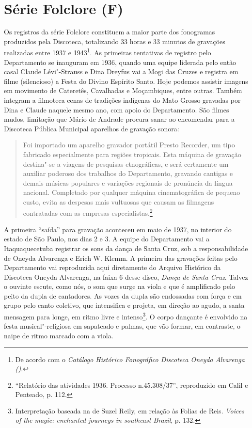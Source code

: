 \section{Série Folclore (F)}

Os registros da série Folclore constituem a maior parte dos fonogramas
produzidos pela Discoteca, totalizando 33 horas e 33 minutos de
gravações realizadas entre 1937 e 1943\footnote{De acordo com o
  \emph{Catálogo Histórico Fonográfico Discoteca Oneyda Alvarenga
  ()}.}. As primeiras tentativas de registro pelo Departamento se
inauguram em 1936, quando uma equipe liderada pelo então casal Claude
Lévi"-Strauss e Dina Dreyfus vai a Mogi das Cruzes e registra em filme
(silencioso) a Festa do Divino Espírito Santo. Hoje podemos assistir
imagens em movimento de Cateretês, Cavalhadas e Moçambiques, entre
outras. Também integram a filmoteca cenas de tradições indígenas do Mato
Grosso gravadas por Dina e Claude naquele mesmo ano, com apoio do
Departamento. São filmes mudos, limitação que Mário de Andrade procura
sanar ao encomendar para a Discoteca Pública Municipal aparelhos de
gravação sonora:

\begin{quote}
Foi importado um aparelho gravador portátil Presto Recorder, um tipo
fabricado especialmente para regiões tropicais. Esta máquina de gravação
destina"-se a viagens de pesquisas etnográficas, e será certamente um
auxiliar poderoso dos trabalhos do Departamento, gravando cantigas e
demais músicas populares e variações regionais de pronúncia da língua
nacional. Completado por qualquer máquina cinematográfica de pequeno
custo, evita as despesas mais vultuosas que causam as filmagens
contratadas com as empresas especialistas.\footnote{``Relatório das
  atividades 1936. Processo n.45.308/37'', reproduzido em Calil e
  Penteado, p. 112.}
\end{quote}

A primeira ``saída'' para gravação aconteceu em maio de 1937, no
interior do estado de São Paulo, nos dias 2 e 3. A equipe do
Departamento vai a Itaquaquecetuba registrar os sons da dança de Santa
Cruz, sob a responsabilidade de Oneyda Alvarenga e Erich W. Klemm. A
primeira das gravações feitas pelo Departamento vai reproduzida aqui
diretamente do Arquivo Histórico da Discoteca Oneyda Alvarenga, na faixa
6 desse disco, \emph{Dança de Santa Cruz}. Talvez o ouvinte escute, como
nós, o som que surge na viola e que é amplificado pelo peito da dupla de
cantadores. As vozes da dupla são endossadas com força e em grupo pelo
canto coletivo, que intensifica e projeta, em direção ao agudo, a santa
mensagem para longe, em ritmo livre e intenso\footnote{Interpretação
  baseada na de Suzel Reily, em relação às Folias de Reis. \emph{Voices
  of the magic: enchanted journeys in southeast Brazil}, p. 132.}. O
corpo dançante é envolvido na festa musical"-religiosa em sapateado e
palmas, que vão formar, em contraste, o naipe de ritmo marcado com a
viola.

